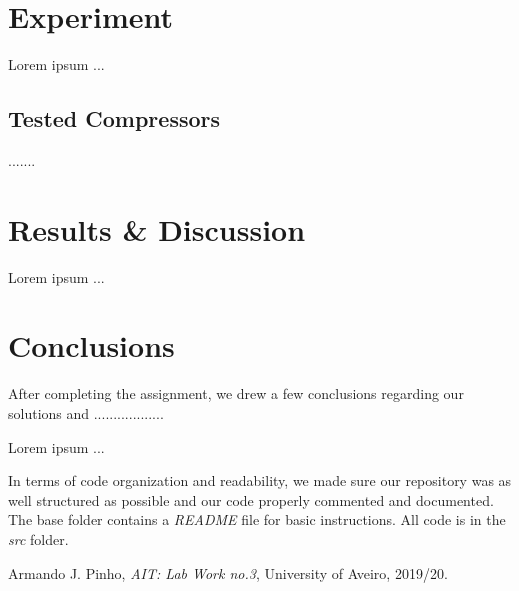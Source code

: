 \documentclass[12pt]{article}
\begin{document}
\section{Experiment}
Lorem ipsum ...

\subsection{Tested Compressors}
.......

\section{Results \& Discussion}
Lorem ipsum ...


\section{Conclusions}

After completing the assignment, we drew a few conclusions regarding our 
solutions and ..................

Lorem ipsum ...

In terms of code organization and readability, we made sure our 
repository was as well structured as possible and our code properly commented
and documented.
The base folder contains a {\it README\/} file for basic instructions.
All code is in the {\it src\/} folder.

\newpage
\begin{thebibliography}{9}
  

    Armando J. Pinho,
    \textit{AIT: Lab Work no.3},
    University of Aveiro,
    2019/20.
  
\end{thebibliography}

\clearpage
\end{document}
